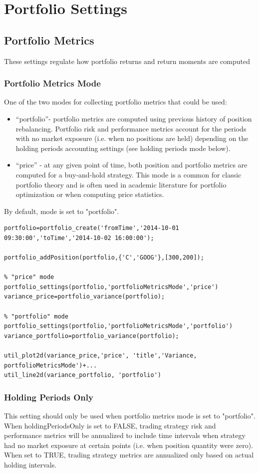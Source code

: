 \documentclass[letterpaper]{report}
\begin{document}
\chapter{Portfolio Settings}
\section{Portfolio Metrics}
These settings regulate how portfolio returns and return moments are computed
\subsection {Portfolio Metrics Mode}
One of the two modes for collecting portfolio metrics that could be used:
\begin{itemize} 					
	\item ``portfolio''- portfolio metrics are computed using previous history of position rebalancing.
						 Portfolio risk and performance metrics account for the periods with no
						 market exposure (i.e. when no positions are held) depending on the
						 holding periods accounting settings (see holding periods mode below).
	\item ``price'' -    at any given point of time, both position and portfolio
						 metrics are computed for a buy-and-hold strategy. 
						 This mode is a common for classic portfolio theory and is often used in
						 academic literature for portfolio optimization or when computing price
						 statistics.
\end{itemize}
By default, mode is set to "portfolio".
\begin{lstlisting}
portfolio=portfolio_create('fromTime','2014-10-01 09:30:00','toTime','2014-10-02 16:00:00');
						   
portfolio_addPosition(portfolio,{'C','GOOG'},[300,200]);

% "price" mode
portfolio_settings(portfolio,'portfolioMetricsMode','price')
variance_price=portfolio_variance(portfolio);

% "portfolio" mode
portfolio_settings(portfolio,'portfolioMetricsMode','portfolio')
variance_portfolio=portfolio_variance(portfolio);

util_plot2d(variance_price,'price', 'title','Variance, portfolioMetricsMode')+...
util_line2d(variance_portfolio, 'portfolio')
\end{lstlisting}

\subsection {Holding Periods Only}
This setting should only be used when portfolio metrics mode is set to "portfolio".
When holdingPeriodsOnly is set to FALSE, trading strategy risk and performance
metrics will be annualized to include time intervals when strategy had no market exposure at certain points (i.e. when position quantity were zero).
When set to TRUE, trading strategy metrics are annualized only based on actual holding intervals.
\end{document}
